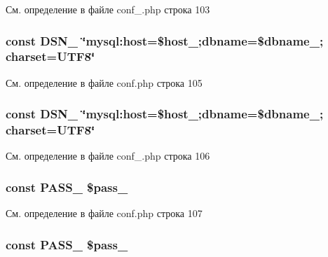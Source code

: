 См. определение в файле conf\-\_\-.\-php строка 103

\hypertarget{group___d_b__2_ga72e6fba3d74199ad6e7e817a61e4a14d}{
\subsubsection[{D\-S\-N\-\_\-2}]{\setlength{\rightskip}{0pt plus 5cm}const D\-S\-N\-\_ \char`\"{}mysql\-:host=\$host\-\_;dbname=\$dbname\-\_; charset=U\-T\-F8\char`\"{}}}\label{group___d_b__2_ga72e6fba3d74199ad6e7e817a61e4a14d}


См. определение в файле conf.\-php строка 105

\hypertarget{group___d_b__2_ga72e6fba3d74199ad6e7e817a61e4a14d}{
\subsubsection[{D\-S\-N\-\_\-2}]{\setlength{\rightskip}{0pt plus 5cm}const D\-S\-N\-\_ \char`\"{}mysql\-:host=\$host\-\_;dbname=\$dbname\-\_; charset=U\-T\-F8\char`\"{}}}\label{group___d_b__2_ga72e6fba3d74199ad6e7e817a61e4a14d}


См. определение в файле conf\-\_\-.\-php строка 106

\hypertarget{group___d_b__2_ga8b3fe80baea61cdf88958113cc16a363}{
\subsubsection[{P\-A\-S\-S\-\_\-2}]{\setlength{\rightskip}{0pt plus 5cm}const P\-A\-S\-S\-\_ \$pass\-\_}}\label{group___d_b__2_ga8b3fe80baea61cdf88958113cc16a363}


См. определение в файле conf.\-php строка 107

\hypertarget{group___d_b__2_ga8b3fe80baea61cdf88958113cc16a363}{
\subsubsection[{P\-A\-S\-S\-\_\-2}]{\setlength{\rightskip}{0pt plus 5cm}const P\-A\-S\-S\-\_ \$pass\-\_}}\label{group___d_b__2_ga8b3fe80baea61cdf88958113cc16a363}


